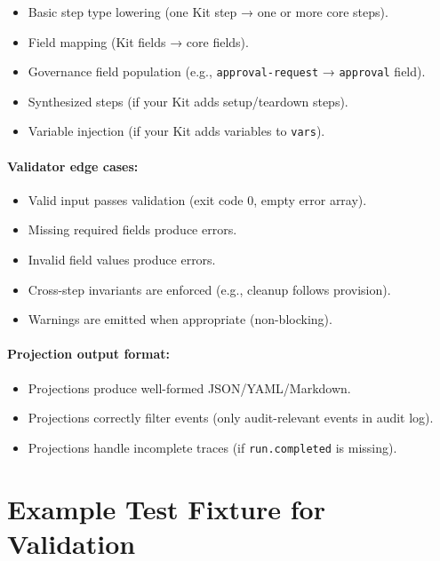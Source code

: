 \begin{itemize}
  \item Basic step type lowering (one Kit step → one or more core steps).
  \item Field mapping (Kit fields → core fields).
  \item Governance field population (e.g., \texttt{approval-request} →
    \texttt{approval} field).
  \item Synthesized steps (if your Kit adds setup/teardown steps).
  \item Variable injection (if your Kit adds variables to \texttt{vars}).
\end{itemize}

\paragraph{Validator edge cases:}

\begin{itemize}
  \item Valid input passes validation (exit code 0, empty error array).
  \item Missing required fields produce errors.
  \item Invalid field values produce errors.
  \item Cross-step invariants are enforced (e.g., cleanup follows provision).
  \item Warnings are emitted when appropriate (non-blocking).
\end{itemize}

\paragraph{Projection output format:}

\begin{itemize}
  \item Projections produce well-formed JSON/YAML/Markdown.
  \item Projections correctly filter events (only audit-relevant events in
    audit log).
  \item Projections handle incomplete traces (if \texttt{run.completed} is
    missing).
\end{itemize}

\section{Example Test Fixture for Validation}
\label{sec:validation-fixture}

